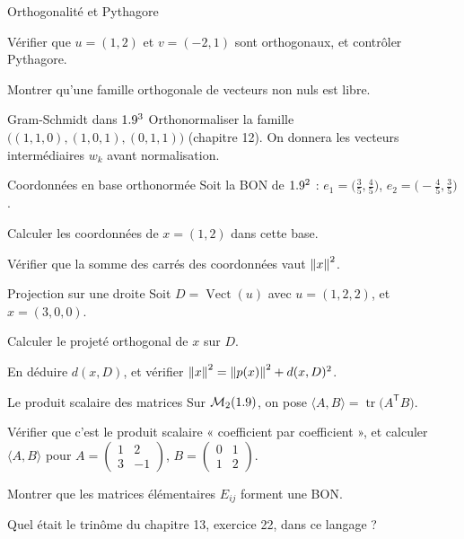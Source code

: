 \begin{exercice}[1]{Orthogonalité et Pythagore}
\begin{questions}
  \item Vérifier que $u=(1,2)$ et $v=(-2,1)$ sont orthogonaux, et
    contrôler Pythagore.
  \item Montrer qu'une famille orthogonale de vecteurs non nuls est
    libre.
\end{questions}
\end{exercice}

\begin{exercice}[1]{Gram-Schmidt dans $1.9^{3}$}
Orthonormaliser la famille $\bigl((1,1,0),(1,0,1),(0,1,1)\bigr)$
(chapitre 12). On donnera les vecteurs intermédiaires $w_k$ avant
normalisation.
\end{exercice}

\begin{exercice}[1]{Coordonnées en base orthonormée}
Soit la BON de $1.9^{2}$ :
$e_1=\bigl(\tfrac35,\tfrac45\bigr)$, $e_2=\bigl(-\tfrac45,\tfrac35\bigr)$.
\begin{questions}
  \item Calculer les coordonnées de $x=(1,2)$ dans cette base.
  \item Vérifier que la somme des carrés des coordonnées vaut
    $\left\lVert x\right\rVert^{2}$.
\end{questions}
\end{exercice}

\begin{exercice}[1]{Projection sur une droite}
Soit $D=\operatorname{Vect}(u)$ avec $u=(1,2,2)$, et $x=(3,0,0)$.
\begin{questions}
  \item Calculer le projeté orthogonal de $x$ sur $D$.
  \item En déduire $d(x,D)$, et vérifier
    $\left\lVert x\right\rVert^{2}=\left\lVert p(x)\right\rVert^{2}+d(x,D)^{2}$.
\end{questions}
\end{exercice}


\begin{exercice}[2]{Le produit scalaire des matrices}
Sur $\mathcal{M}_2(1.9)$, on pose
$\langle A,B\rangle=\operatorname{tr}\bigl(A^{\mathsf T}B\bigr)$.
\begin{questions}
  \item Vérifier que c'est le produit scalaire « coefficient par
    coefficient », et calculer $\langle A,B\rangle$ pour
    $A=\begin{pmatrix}1&2\\3&-1\end{pmatrix}$,
    $B=\begin{pmatrix}0&1\\1&2\end{pmatrix}$.
  \item Montrer que les matrices élémentaires $E_{ij}$ forment une BON.
  \item Quel était le trinôme du chapitre 13, exercice 22, dans ce
    langage ?
\end{questions}
\end{exercice}

